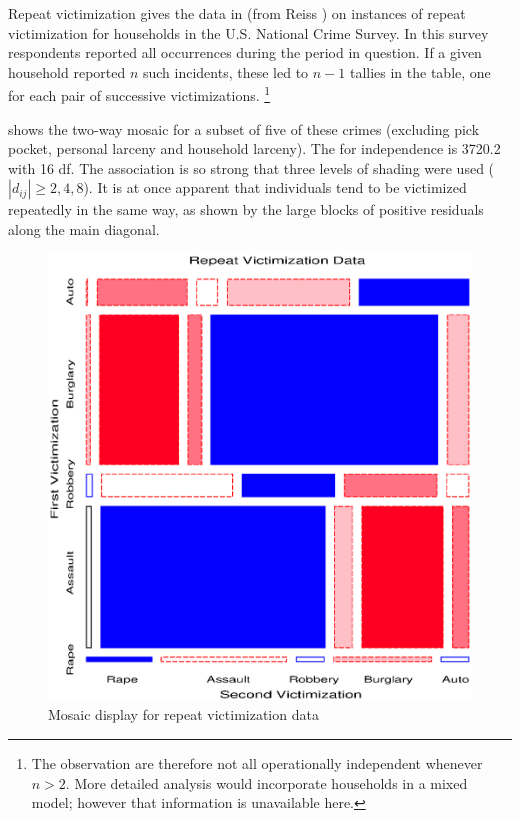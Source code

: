 \begin{Example}[victims]{Repeat victimization}
\citet[Table 2-8]{Fienberg:80} gives the data in
 (from Reiss \citeyear{Reiss:80}) on instances of
repeat victimization for households in the U.S. National Crime Survey.
In this survey respondents reported all occurrences during the
period in question.  If a given household reported $n$ such incidents,
these led to $n-1$ tallies in the table, one for each pair of successive
victimizations.%
\footnote{The observation are therefore not all operationally independent
whenever $n>2$.  More detailed analysis would incorporate households
in a mixed model; however that information is unavailable here.}


 shows the two-way mosaic for a subset of five of these
crimes (excluding pick pocket, personal larceny and household larceny).
The \chisq{} for independence is 3720.2 with 16 df.  The association
is so strong that three levels of shading were used ($|d_{ij}| \ge 2, 4, 8$).
It is at once apparent that individuals tend to be victimized repeatedly in the same way, as shown by the large blocks of positive residuals along
the main diagonal.

\begin{figure}[htb]
  \centering
  \includegraphics[scale=.6]{ch4/fig/victims1}
  \caption{Mosaic display for repeat victimization data}%
  \label{fig:victims1}
\end{figure}


\end{Example}
